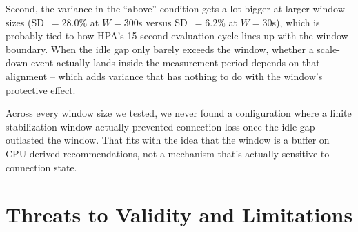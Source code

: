 \documentclass[pdflatex,sn-mathphys-num]{sn-jnl}
\theoremstyle{thmstyleone}%
\theoremstyle{thmstyletwo}%
\theoremstyle{thmstylethree}%
\begin{document}
Second, the variance in the ``above'' condition gets a lot bigger at larger window
sizes (SD~$= 28.0\%$ at $W=300$s versus SD~$= 6.2\%$ at $W=30$s), which is probably
tied to how HPA's 15-second evaluation cycle lines up with the window boundary.
When the idle gap only barely exceeds the window, whether a scale-down event
actually lands inside the measurement period depends on that alignment -- which
adds variance that has nothing to do with the window's protective effect.

Across every window size we tested, we never found a configuration where a finite
stabilization window actually prevented connection loss once the idle gap outlasted
the window. That fits with the idea that the window is a buffer on CPU-derived
recommendations, not a mechanism that's actually sensitive to connection state.

\section{Threats to Validity and Limitations}
\label{sec:limitations}
\end{document}
